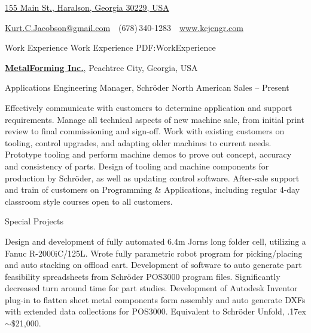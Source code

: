 \documentclass[
letterpaper,
MMMyyyy,
nonstopmode,
]{resume}
\makeatletter
\newcommand{\CVAuthor}{Kurt C. Jacobson}
\newcommand{\CVWebpage}{www.kcjengr.com}
\newcommand{\CVEmail}{Kurt.C.Jacobson@gmail.com}
\makeatother
\begin{document}

\Title{\CVAuthor}

\begin{SubTitle}
\href{https://www.google.com/maps/place/155+Main+St,+Haralson,+GA+30229/}
{155 Main St., Haralson, Georgia 30229, USA}
\par
\href{mailto:\CVEmail}
{\CVEmail}
\,\SubBulletSymbol\,
(678)\,340-1283
\,\SubBulletSymbol\,
\href{\CVWebpage}
{\url{\CVWebpage}}
\end{SubTitle}

\begin{Body}



\Section
{Work Experience}
{Work Experience}
{PDF:WorkExperience}


\Entry
\href{http://www.metalforming-usa.net/}
{\textbf{MetalForming Inc.}},
Peachtree City, Georgia, USA

\Gap
\BulletItem
Applications Engineering Manager,
Schr{\"o}der North American Sales
\hfill
{} --
Present
\begin{Detail}
\SubBulletItem
Effectively communicate with customers to determine application and support requirements. 
\SubBulletItem
Manage all technical aspects of new machine sale, from initial print review to final commissioning and sign-off.
\SubBulletItem
Work with existing customers on tooling, control upgrades, and adapting older machines to current needs.  
\SubBulletItem
Prototype tooling and perform machine demos to prove out concept, accuracy and consistency of parts.
\SubBulletItem
Design of tooling and machine components for production by Schr{\"o}der, as well as updating control software.
\SubBulletItem
After-sale support and train of customers on Programming {\&} Applications, including regular 4-day classroom style courses open to all customers.
\end{Detail}

\Gap
\BulletItem
Special Projects
\hfill
\begin{Detail}
\SubBulletItem
Design and development of fully automated 6.4m Jorns long folder cell, utilizing a Fanuc R-2000iC/125L.
Wrote fully parametric robot program for picking/placing and auto stacking on offload cart.
\SubBulletItem
Development of software to auto generate part feasibility spreadsheets from Schr{\"o}der POS3000 program files.
Significantly decreased turn around time for part studies.
\SubBulletItem
Development of Autodesk Inventor plug-in to flatten sheet metal components form assembly and auto generate DXFs with extended data collections for POS3000. Equivalent to  Schr{\"o}der Unfold, {\raise.17ex\hbox{$\scriptstyle\mathtt{\sim}$}}{\$}21,000.
\end{Detail}


\end{Body}
\end{document}
